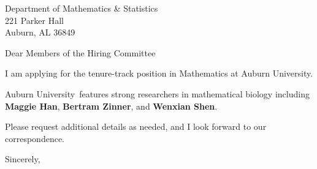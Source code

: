 




	
	
	\def\School{Auburn University}
	
	\begin{letter}
		{Department of Mathematics \& Statistics\\
			221 Parker Hall\\
			Auburn, AL 36849
		}
		
		\opening{Dear Members of the Hiring Committee}
		
		
		I am applying for the tenure-track position in Mathematics at \School. 
		
		
		
		\School~features strong researchers in mathematical biology including \textbf{Maggie Han}, \textbf{Bertram Zinner},  and \textbf{Wenxian Shen}. 
		
		
		
		
		
		Please request additional details as needed, and I look forward to our correspondence.
		
		\closing{Sincerely,}
	\end{letter}
